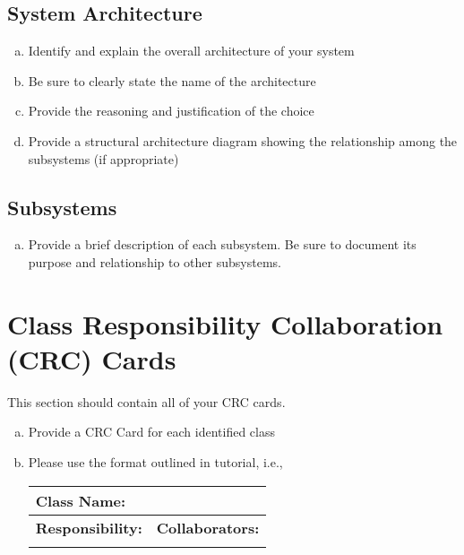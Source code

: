 \documentclass[]{article}
\begin{document}
\subsection{System Architecture}
\label{sub:system_architecture}
\begin{enumerate}[a)]
	\item Identify and explain the overall architecture of your system
	\item Be sure to clearly state the name of the architecture
	\item Provide the reasoning and justification of the choice
	\item Provide a structural architecture diagram showing the relationship among the subsystems (if appropriate)
\end{enumerate}

\subsection{Subsystems}
\label{sub:subsystems}
\begin{enumerate}[a)]
	\item Provide a brief description of each subsystem. Be sure to document its purpose and relationship to other subsystems.
\end{enumerate}

	
\section{Class Responsibility Collaboration (CRC) Cards}
\label{sec:class_responsibility_collaboration_crc_cards}
This section should contain all of your CRC cards.

\begin{enumerate}[a)]
	\item Provide a CRC Card for each identified class
	\item Please use the format outlined in tutorial, i.e., 
	\begin{table}[ht]
		\centering
		\begin{tabular}{|p{5cm}|p{5cm}|}
		\hline 
		 \multicolumn{2}{|l|}{\textbf{Class Name:}} \\
		\hline
		\textbf{Responsibility:} & \textbf{Collaborators:} \\
		\hline
		\vspace{1in} & \\
		\hline
		\end{tabular}
	\end{table}
	
\end{enumerate}
\end{document}
